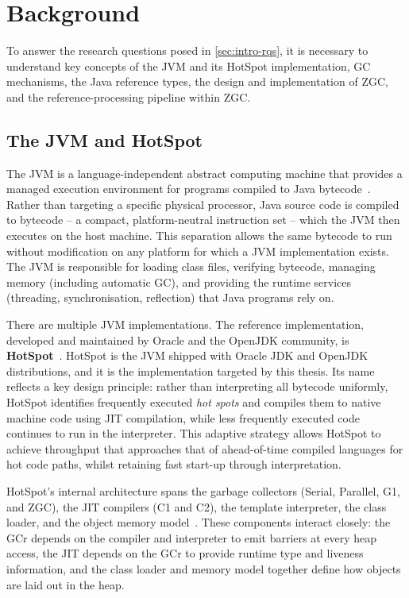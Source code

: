 \chapter{Background}
\label{chap:background}

To answer the research questions posed in \cref{sec:intro-rqs}, it is necessary to understand key concepts of the \ac{JVM} and its HotSpot implementation, \ac{GC} mechanisms, the Java reference types, the design and implementation of \ac{ZGC}, and the reference-processing pipeline within \ac{ZGC}.

\section{The JVM and HotSpot}
\label{sec:bg-jvm-hotspot}

The \ac{JVM} is a language-independent abstract computing machine that provides a managed execution environment for programs compiled to Java bytecode~\cite{oracle-gc-implementation}. Rather than targeting a specific physical processor, Java source code is compiled to bytecode -- a compact, platform-neutral instruction set -- which the \ac{JVM} then executes on the host machine. This separation allows the same bytecode to run without modification on any platform for which a \ac{JVM} implementation exists. The \ac{JVM} is responsible for loading class files, verifying bytecode, managing memory (including automatic \ac{GC}), and providing the runtime services (threading, synchronisation, reflection) that Java programs rely on.

There are multiple \ac{JVM} implementations. The reference implementation, developed and maintained by Oracle and the OpenJDK community, is \textbf{HotSpot}~\cite{oracle-hotspot-jvm,openjdk-hotspot-overview}. HotSpot is the \ac{JVM} shipped with Oracle \ac{JDK} and OpenJDK distributions, and it is the implementation targeted by this thesis. Its name reflects a key design principle: rather than interpreting all bytecode uniformly, HotSpot identifies frequently executed \emph{hot spots} and compiles them to native machine code using \ac{JIT} compilation, while less frequently executed code continues to run in the interpreter. This adaptive strategy allows HotSpot to achieve throughput that approaches that of ahead-of-time compiled languages for hot code paths, whilst retaining fast start-up through interpretation.

HotSpot's internal architecture spans the garbage collectors (Serial, Parallel, G1, and \ac{ZGC}), the \ac{JIT} compilers (C1 and C2), the template interpreter, the class loader, and the object memory model~\cite{oracle-hotspot-jvm}. These components interact closely: the \ac{GCr} depends on the compiler and interpreter to emit barriers at every heap access, the \ac{JIT} depends on the \ac{GCr} to provide runtime type and liveness information, and the class loader and memory model together define how objects are laid out in the heap.

